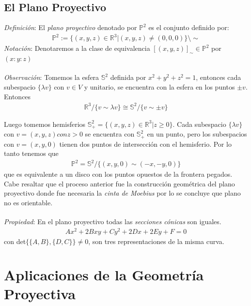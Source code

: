 \documentclass[10pt,a4paper]{article}
\begin{document}
\subsection{El Plano Proyectivo}

\textit{Definición}: El \textit{plano proyectivo} denotado por $\mathbb{P}^{2}$ es el conjunto definido por:
\begin{align*}
 \mathbb{P}^{2} := \lbrace (x,y,z) \in \mathbb{R}^{3} | (x,y,z) \neq (0,0,0) \rbrace \setminus \sim 
\end{align*}
\textit{Notación}: Denotaremos a la clase de equivalencia $[(x,y,z)]_{\sim} \in \mathbb{P}^{2}$ por $(x:y:z)$
\\
\\
\textit{Observación}: Tomemos la esfera $\mathbb{S}^{2}$ definida por $x^2+y^2+z^2=1$, entonces cada subespacio $ \lbrace \lambda v \rbrace $ con $v \in V$ y unitario, se encuentra con la esfera en los puntos $\pm v$. Entonces 
\begin{align*}
  \mathbb{R}^{3}/\lbrace v \sim \lambda v \rbrace \cong \mathbb{S}^{2}/ \lbrace v \sim \pm v \rbrace
\end{align*} 

Luego tomemos hemisferios $\mathbb{S}^{2}_{+} = \lbrace (x,y,z) \in \mathbb{R}^{3} | z \geq 0 \rbrace$. Cada  subespacio $ \lbrace \lambda v \rbrace $ con $v = (x,y,z) con z > 0 $ se encuentra con $\mathbb{S}^{2}_{+}$ en un punto, pero los subespacios con $v = (x,y,0)$ tienen dos puntos de intersección con el hemisferio. Por lo tanto tenemos que 
\begin{align*}
\mathbb{P}^2 = \mathbb{S}^{2}/ \lbrace (x,y,0) \sim (-x,-y,0)\rbrace
\end{align*} que es equivalente a un disco con los puntos opuestos de la frontera pegados. Cabe resaltar que el proceso anterior fue la construcción geométrica del plano proyectivo donde fue necesaria la \textit{cinta de Moebius} por lo se concluye que plano no es orientable.
\\
\\ \textit{Propiedad}: En el plano proyectivo todas las \textit{secciones cónicas} son iguales.
\begin{align*}
Ax^2+2Bxy+Cy^2+2Dx+2Ey+F=0 
\end{align*}con det$\lbrace \lbrace A,B \rbrace,\lbrace D,C\rbrace \rbrace \neq 0$, son tres representaciones de la misma curva.

\section{Aplicaciones de la Geometría Proyectiva}
\end{document}
